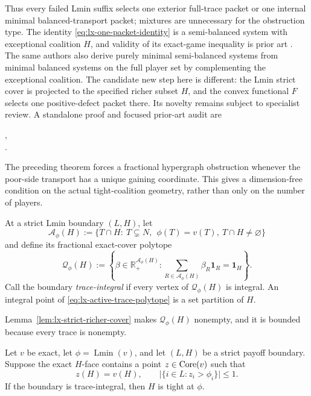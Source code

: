 Thus every failed Lmin suffix selects one exterior full-trace packet or one
internal minimal balanced-transport packet; mixtures are unnecessary for the
obstruction type.  The identity
\eqref{eq:lx-one-packet-identity} is a semi-balanced system with exceptional
coalition $H$, and validity of its exact-game inequality is prior art
\citep{StudenyKratochvil2022}.  The same authors also derive purely minimal
semi-balanced systems from minimal balanced systems on the full player set by
complementing the exceptional coalition.  The candidate new step here is
different: the Lmin strict cover is projected to the specified richer subset
$H$, and the convex functional $F$ selects one positive-defect packet there.
Its novelty remains subject to specialist review.  A standalone proof and
focused prior-art audit are
\begin{center}
\small{},\\[-2pt]
\small{}.
\end{center}

The preceding theorem forces a fractional hypergraph obstruction whenever the
poor-side transport has a unique gaining coordinate.  This gives a
dimension-free condition on the actual tight-coalition geometry, rather than
only on the number of players.

\begin{definition}
\label{def:lx-active-trace-polytope}
At a strict Lmin boundary $(L,H)$, let
\[
 \mathcal A_\phi(H):=\{T\cap H:\ T\subsetneq N,\
   \ \phi(T)=v(T),\ T\cap H\ne\varnothing\}
\]
and define its fractional exact-cover polytope
\[
 \mathcal Q_\phi(H):=
 \left\{\beta\in\mathbb R_+^{\mathcal A_\phi(H)}:
   \sum_{R\in\mathcal A_\phi(H)}\beta_R\mathbf1_R
      =\mathbf1_H\right\}.                         \tag{AT}
 \label{eq:lx-active-trace-polytope}
\]
Call the boundary \emph{trace-integral} if every vertex of
$\mathcal Q_\phi(H)$ is integral.  An integral point of
\eqref{eq:lx-active-trace-polytope} is a set partition of $H$.
\end{definition}

Lemma~\ref{lem:lx-strict-richer-cover} makes
$\mathcal Q_\phi(H)$ nonempty, and it is bounded because every trace is
nonempty.

\begin{theorem}
\label{thm:lx-integral-trace-obstruction}
Let $v$ be exact, let $\phi=\operatorname{Lmin}(v)$, and let $(L,H)$ be a
strict payoff boundary.  Suppose the exact $H$-face contains a point
$z\in\operatorname{Core}(v)$ such that
\[
 z(H)=v(H),\qquad
 \bigl|\{i\in L:z_i>\phi_i\}\bigr|\leq1.            \tag{IT}
 \label{eq:lx-integral-trace-witness}
\]
If the boundary is trace-integral, then $H$ is tight at $\phi$.
\end{theorem}


